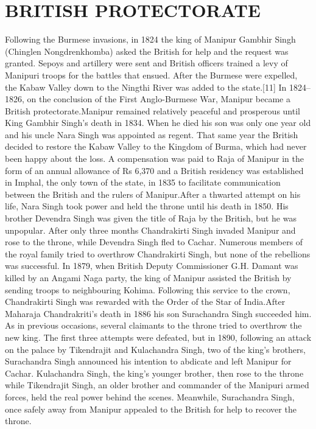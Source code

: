 \documentclass[10pt,a4 paper,two coloum] {article}
\begin{document}
\section{BRITISH PROTECTORATE}
Following the Burmese invasions, in 1824 the king of Manipur Gambhir Singh (Chinglen Nongdrenkhomba) asked the British for help and the request was granted. Sepoys and artillery were sent and British officers trained a levy of Manipuri troops for the battles that ensued. After the Burmese were expelled, the Kabaw Valley down to the Ningthi River was added to the state.[11] In 1824–1826, on the conclusion of the First Anglo-Burmese War, Manipur became a British protectorate.Manipur remained relatively peaceful and prosperous until King Gambhir Singh's death in 1834. When he died his son was only one year old and his uncle Nara Singh was appointed as regent. That same year the British decided to restore the Kabaw Valley to the Kingdom of Burma, which had never been happy about the loss. A compensation was paid to Raja of Manipur in the form of an annual allowance of Rs 6,370 and a British residency was established in Imphal, the only town of the state, in 1835 to facilitate communication between the British and the rulers of Manipur.After a thwarted attempt on his life, Nara Singh took power and held the throne until his death in 1850. His brother Devendra Singh was given the title of Raja by the British, but he was unpopular. After only three months Chandrakirti Singh invaded Manipur and rose to the throne, while Devendra Singh fled to Cachar. Numerous members of the royal family tried to overthrow Chandrakirti Singh, but none of the rebellions was successful. In 1879, when British Deputy Commissioner G.H. Damant was killed by an Angami Naga party, the king of Manipur assisted the British by sending troops to neighbouring Kohima. Following this service to the crown, Chandrakirti Singh was rewarded with the Order of the Star of India.After Maharaja Chandrakriti's death in 1886 his son Surachandra Singh succeeded him. As in previous occasions, several claimants to the throne tried to overthrow the new king. The first three attempts were defeated, but in 1890, following an attack on the palace by Tikendrajit and Kulachandra Singh, two of the king's brothers, Surachandra Singh announced his intention to abdicate and left Manipur for Cachar. Kulachandra Singh, the king's younger brother, then rose to the throne while Tikendrajit Singh, an older brother and commander of the Manipuri armed forces, held the real power behind the scenes. Meanwhile, Surachandra Singh, once safely away from Manipur appealed to the British for help to recover the throne.
\end{document}
